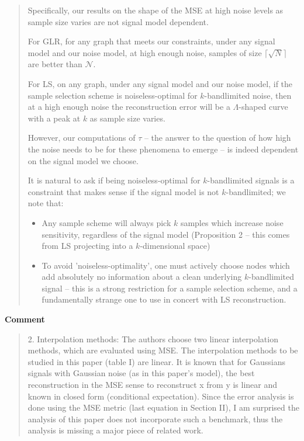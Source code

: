 \documentclass[11pt,onecolumn,journal]{IEEEtran}
\theoremstyle{definition}
\newcommand{\set}[1]{\mathcal{#1}}
\begin{document}
\begin{quote}
Specifically, our results on the shape of the MSE at high noise levels as sample size varies are not signal model dependent. 

For GLR, for any graph that meets our constraints, under any signal model and our noise model, at high enough noise, samples of size $\lceil\sqrt{N}\rceil$ are better than $\set{N}$.

For LS, on any graph, under any signal model and our noise model, if the sample selection scheme is noiseless-optimal for $k$-bandlimited noise, then at a high enough noise the reconstruction error will be a $\Lambda$-shaped curve with a peak at $k$ as sample size varies.


However, our computations of $\tau$ -- the answer to the question of how high the noise needs to be for these phenomena to emerge -- is indeed dependent on the signal model we choose.

It is natural to ask if being noiseless-optimal for $k$-bandlimited signals is a constraint that makes sense if the signal model is not $k$-bandlimited; we note that:
\begin{itemize}
    \item Any sample scheme will always pick $k$ samples which increase noise sensitivity, regardless of the signal model (Proposition 2 -- this comes from LS projecting into a $k$-dimensional space)
    \item To avoid 'noiseless-optimality', one must actively choose nodes which add absolutely no information about a clean underlying $k$-bandlimited signal -- this is a strong restriction for a sample selection scheme, and a fundamentally strange one to use in concert with LS reconstruction.
\end{itemize}
\fi
\end{quote}


\textbf{Comment}
\begin{quote}
2. Interpolation methods: The authors choose two linear interpolation methods, which are evaluated using MSE.  The interpolation methods to be studied in this paper (table I) are linear. It is known that for Gaussians signals with Gaussian noise (as in this paper’s model), the best reconstruction in the MSE sense to reconstruct x from y is linear and known in closed form (conditional expectation).  Since the error analysis is done using the MSE metric (last equation in Section II), I am surprised the analysis of this paper does not incorporate such a benchmark, thus the analysis is missing a major piece of related work.
\end{quote}
\end{document}
